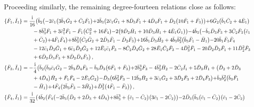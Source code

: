 \documentclass[10pt]{amsart}
\theoremstyle{definition}
\theoremstyle{corollary}
\theoremstyle{remark}
\theoremstyle{conclusion}
\begin{document}
  Proceeding similarly, the remaining degree-fourteen relations close as follows:
\begin{align}
\{\bar{F}_1, \bar{I}_1\}&=\frac{{\rm i}}{16}  \bigl(\bar{b}_2 \bigl(-2 \bar{c}_1 \bigl(3 \bar{b}_1 \bar{G}_2+\bar{C}_2 \bar{F}_1\bigl)+2 \bar{b}_3 \bigl(2 \bar{c}_1 \bar{G}_1+8 \bar{D}_3 \bar{F}_1+4 \bar{D}_4 \bar{F}_1+\bar{D}_2 \bigl(10 \bar{F}_1+\bar{F}_3\bigl)\bigl)+6 \bar{G}_2 \bigl(\bar{b}_1 \bar{C}_2+4 \bar{E}_1\bigl) \nonumber \\
& \hskip 0.7cm-8 \bar{b}_3^3 \bar{F}_1+3 \bar{c}_1^2 \bar{F}_1-\bar{F}_1 \bigl(\bar{C}_2^2+16 \bar{F}_4\bigl)-2 \bigl(9 \bar{D}_2 \bar{H}_1+10 \bar{D}_3 \bar{H}_1+4 \bar{E}_1 \bar{G}_1\bigl)\bigl)-4 \bar{b}_3 \bigl(-\bar{b}_1 \bar{D}_3 \bar{F}_3+3 \bar{C}_2 \bar{F}_3 \bigl(\bar{c}_1 \nonumber \\
& \hskip 0.7cm+\bar{C}_2\bigl)+4 \bar{F}_1 \bar{F}_4\bigl)+8 \bar{b}_3^2 \bigl(\bar{C}_2 \bar{G}_2+2 \bar{D}_3 \bar{F}_1-\bar{D}_2 \bar{F}_3\bigl)+16 \bar{b}_1 \bar{D}_3 \bar{H}_2+4 \bar{b}_3 \bar{b}_2^2 \bigl(\bar{b}_3 \bar{F}_1-\bar{H}_1\bigl)-20 \bar{b}_1 \bar{F}_3 \bar{F}_4 \nonumber \\
& \hskip 0.7cm-12 \bar{c}_1 \bar{D}_3 \bar{G}_1+6 \bar{c}_1 \bar{D}_2 \bar{G}_2+12 \bar{E}_1 \bar{c}_1 \bar{F}_3-8 \bar{C}_2 \bar{D}_4 \bar{G}_2+28 \bar{E}_1 \bar{C}_2 \bar{F}_3-4 \bar{D}_3^2 \bar{F}_1-20 \bar{D}_2 \bar{D}_3 \bar{F}_1+11 \bar{D}_2^2 \bar{F}_3\nonumber \\
& \hskip 0.7cm+6 \bar{D}_2 \bar{D}_3 \bar{F}_3+8 \bar{D}_2 \bar{D}_4 \bar{F}_3\bigl) \, ,\nonumber \\
\{\bar{F}_3, \bar{I}_1\}&=-\frac{{\rm i}}{4}  \bigl(\bar{b}_2 \bigl(\bar{b}_3 \bar{c}_1 \bar{G}_2-2 \bar{b}_3 \bar{D}_4 \bar{F}_3-\bar{b}_3 \bar{D}_3 \bigl(6 \bar{F}_1+\bar{F}_3\bigl)+2 \bar{b}_3^3 \bar{F}_3-4 \bar{b}_3^2 \bar{H}_2-2 \bar{C}_2 \bar{I}_1+5 \bar{D}_3 \bar{H}_1+\bigl(\bar{D}_2+2 \bar{D}_3 \nonumber \\
& \hskip 0.7cm+4 \bar{D}_4\bigl) \bar{H}_2+\bar{F}_1 \bar{F}_4-2 \bar{E}_1 \bar{G}_2\bigl)-\bar{D}_3 \bigl(6 \bar{b}_3^2 \bar{F}_3-12 \bar{b}_3 \bar{H}_2+3 \bar{c}_1 \bar{G}_2+3 \bar{D}_2 \bar{F}_3+2 \bar{D}_4 \bar{F}_3\bigl)+\bar{b}_3 \bar{b}_2^2 \bigl(\bar{b}_3 \bar{F}_1 \nonumber \\
& \hskip 0.7cm-\bar{H}_1\bigl)+4 \bar{F}_4 \bigl(2 \bar{b}_3 \bar{F}_3-3 \bar{H}_2\bigl)+\bar{D}_3^2 \bigl(4 \bar{F}_1-\bar{F}_3\bigl)\bigl) \, ,\nonumber \\
\{\bar{F}_4, \bar{I}_1\}&=\frac{{\rm i}}{32} \bigl(4 \bar{b}_2 \bigl(\bar{F}_4 \bigl(-2 \bar{b}_3 \bigl(\bar{D}_2+2 \bar{D}_3+4 \bar{D}_4\bigl)+8 \bar{b}_3^3+\bigl(\bar{c}_1-\bar{C}_2\bigl) \bigl(3 \bar{c}_1-2 \bar{C}_2\bigl)\bigl)-2 \bar{D}_3 \bigl(\bar{b}_3 \bigl(\bar{c}_1-\bar{C}_2\bigl) \bigl(\bar{c}_1-2 \bar{C}_2\bigl) \nonumber \\

\end{align}
\end{document}
